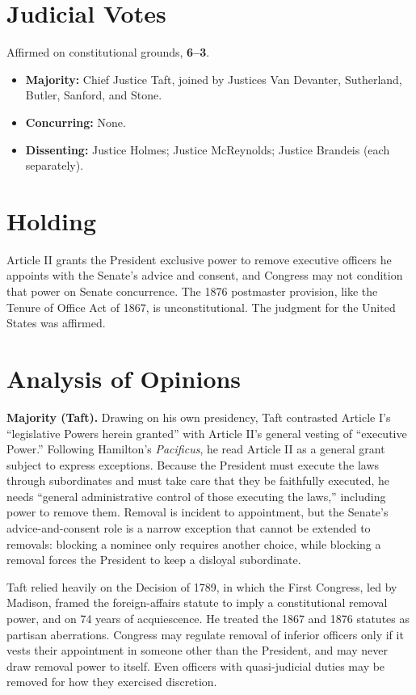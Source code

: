 \documentclass[12pt]{article}
\begin{document}
\section{Judicial Votes}

Affirmed on constitutional grounds, \textbf{6--3}.
\begin{itemize}
\item \textbf{Majority:} Chief Justice Taft, joined by Justices Van Devanter, Sutherland, Butler, Sanford, and Stone.
\item \textbf{Concurring:} None.
\item \textbf{Dissenting:} Justice Holmes; Justice McReynolds; Justice Brandeis (each separately).
\end{itemize}

\section{Holding}

Article II grants the President exclusive power to remove executive officers he appoints with the Senate's advice and consent, and Congress may not condition that power on Senate concurrence. The 1876 postmaster provision, like the Tenure of Office Act of 1867, is unconstitutional. The judgment for the United States was affirmed.

\section{Analysis of Opinions}

\textbf{Majority (Taft).} Drawing on his own presidency, Taft contrasted Article I's ``legislative Powers herein granted'' with Article II's general vesting of ``executive Power.'' Following Hamilton's \textit{Pacificus}, he read Article II as a general grant subject to express exceptions. Because the President must execute the laws through subordinates and must take care that they be faithfully executed, he needs ``general administrative control of those executing the laws,'' including power to remove them. Removal is incident to appointment, but the Senate's advice-and-consent role is a narrow exception that cannot be extended to removals: blocking a nominee only requires another choice, while blocking a removal forces the President to keep a disloyal subordinate.

Taft relied heavily on the Decision of 1789, in which the First Congress, led by Madison, framed the foreign-affairs statute to imply a constitutional removal power, and on 74 years of acquiescence. He treated the 1867 and 1876 statutes as partisan aberrations. Congress may regulate removal of inferior officers only if it vests their appointment in someone other than the President, and may never draw removal power to itself. Even officers with quasi-judicial duties may be removed for how they exercised discretion.
\end{document}
